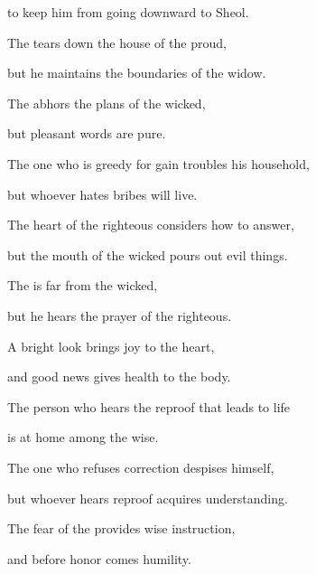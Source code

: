 {\par }{\Q to keep him from
going downward
to Sheol.
\par }{\Q {}The
{}
tears down the house
of the proud,
\par }{\Q but he maintains
the boundaries
of the widow.
\par }{\Q {}The
{}
abhors
the plans
of the wicked,
\par }{\Q but pleasant
words
are pure.
\par }{\Q {}The one who is greedy
for gain
troubles
his household,
\par }{\Q but whoever hates
bribes
will live.
\par }{\Q {}The heart
of the righteous
considers
how to answer,
\par }{\Q but the mouth
of the wicked
pours
out evil things.
\par }{\Q {}The
{}
is far
from the wicked,
\par }{\Q but he hears
the prayer
of the righteous.
\par }{\Q {}A bright
look
brings joy
to the heart,
\par }{\Q and good
news
gives health
to the body.
\par }{\Q {}The person
who hears
the reproof
that leads to life
\par }{\Q is at home
among
the wise.
\par }{\Q {}The one who refuses
correction
despises
himself,
\par }{\Q but whoever hears
reproof
acquires
understanding.
\par }{\Q {}The fear
of the {}
provides wise
instruction,
\par }{\Q and before
honor
comes humility.

\par }
